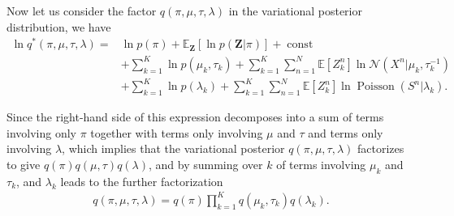 \documentclass[11pt]{extarticle}
\newcommand{\N}{\mathcal{N}}
\newcommand{\Z}{\mathbf{Z}}
\newcommand{\0}{\mathbf{0}}
\renewcommand{\(}{\left(}
\renewcommand{\)}{\right)}
\DeclareMathOperator{\const}{const}
\DeclareMathOperator{\Poisson}{Poisson}
\theoremstyle{definition}
\begin{document}
\par Now let us consider the factor $q(\pi, \mu, \tau, \lambda)$ in the variational posterior distribution, we have
\begin{align*}
	\ln q^{*}(\pi, \mu, \tau, \lambda) =& \ln p(\pi) + \mathbb{E}_{\Z}[\ln p(\Z \vert \pi)] + \const \\ & + \sum_{k=1}^{K}\ln p(\mu_{k}, \tau_{k}) + \sum_{k=1}^{K}\sum_{n=1}^{N} \mathbb{E}[Z^{n}_{k}]\ln \N(X^{n} \vert \mu_{k}, \tau_{k}^{-1}) \\ & + \sum_{k=1}^{K}\ln p(\lambda_{k}) + \sum_{k=1}^{K}\sum_{n=1}^{N}\mathbb{E}[Z^{n}_{k}]\ln\Poisson(S^{n} \vert \lambda_{k}).
\end{align*}
\par Since the right-hand side of this expression decomposes into a sum of terms involving only $\pi$ together with terms only involving $\mu$ and $\tau$ and terms only involving $\lambda$, which implies that the variational posterior $q(\pi, \mu, \tau, \lambda)$ factorizes to give $q(\pi)q(\mu, \tau)q(\lambda)$, and by summing over $k$ of terms involving $\mu_{k}$ and $\tau_{k}$, and $\lambda_{k}$ leads to the further factorization
\begin{align*}
	q(\pi, \mu, \tau, \lambda) = q(\pi) \prod_{k=1}^{K} q(\mu_{k}, \tau_{k}) q(\lambda_{k}).
\end{align*}
\end{document}
